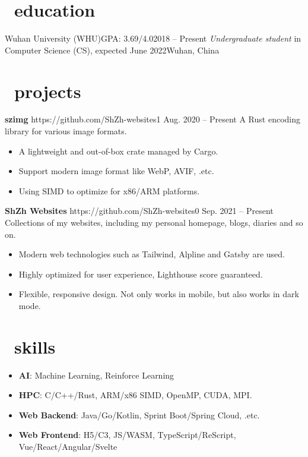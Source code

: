 \documentclass{common}
\begin{document}

\section{\faGraduationCap\ education}
\educationsubsection
    {Wuhan University (WHU)}{GPA: 3.69/4.0}{2018 -- Present}
    {\textit{Undergraduate student} in Computer Science (CS), expected June 2022}{Wuhan, China}

\section{\faCubes\ projects}
\projectsubsection
    {\textbf{szimg}}
    {https://github.com/ShZh-websites}{1}
    {Aug. 2020 -- Present}
A Rust encoding library for various image formats.
\begin{itemize}
    \item A lightweight and out-of-box crate managed by Cargo.
    \item Support modern image format like WebP, AVIF, .etc.
    \item Using SIMD to optimize for x86/ARM platforms.
\end{itemize}
\projectsubsection
    {\textbf{ShZh Websites}}
    {https://github.com/ShZh-websites}{0}
    {Sep. 2021 -- Present}
Collections of my websites, including my personal homepage, blogs, diaries and so on.
\begin{itemize}
    \item Modern web technologies such as Tailwind, Alpline and Gatsby are used.
    \item Highly optimized for user experience, Lighthouse score guaranteed.
    \item Flexible, responsive design. Not only works in mobile, but also works in dark mode.
\end{itemize}

\section{\faCogs\ skills}
\begin{itemize}[parsep=0.5ex]
    \item \textbf{AI}: Machine Learning, Reinforce Learning
    \item \textbf{HPC}: C/C++/Rust, ARM/x86 SIMD, OpenMP, CUDA, MPI.
    \item \textbf{Web Backend}: Java/Go/Kotlin, Sprint Boot/Spring Cloud, .etc.
    \item \textbf{Web Frontend}: H5/C3, JS/WASM, TypeScript/ReScript, Vue/React/Angular/Svelte
\end{itemize}
\end{document}
